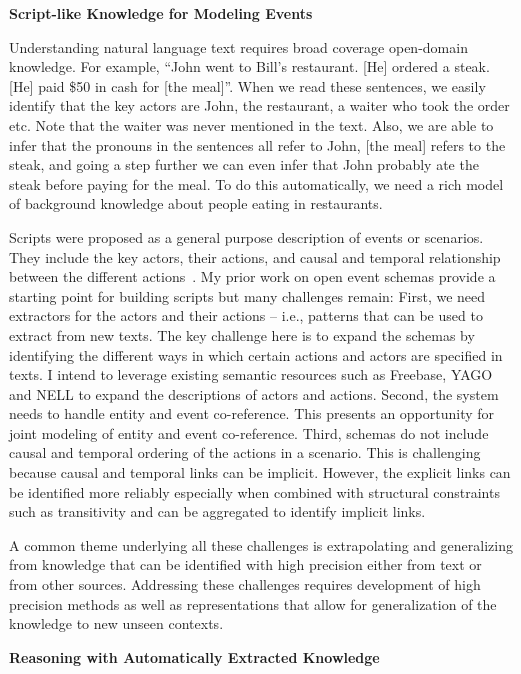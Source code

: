 \documentclass[a4paper,11pt,onecolumn]{article}
\begin{document}
{\bf Script-like Knowledge for Modeling Events}

Understanding natural language text requires broad coverage open-domain knowledge. For example, ``John went to Bill's restaurant. [He] ordered a steak. [He] paid \$50 in cash for [the meal]''. When we read these sentences, we easily identify that the key actors are John, the restaurant, a waiter who took the order etc. Note that the waiter was never mentioned in the text. Also, we are able to infer that the pronouns in the sentences all refer to John, [the meal] refers to the steak, and going a step further we can even infer that John probably ate the steak before paying for the meal. To do this automatically, we need a rich model of background knowledge about people eating in restaurants.

Scripts were proposed as a general purpose description of events or scenarios. They include the key actors, their actions, and causal and temporal relationship between the different actions~\cite{schank-scripts75}. My prior work on open event schemas provide a starting point for building scripts but many challenges remain: First, we need extractors for the actors and their actions -- i.e., patterns that can be used to extract from new texts. The key challenge here is to expand the schemas by identifying the different ways in which certain actions and actors are specified in texts. I intend to leverage existing semantic resources such as Freebase, YAGO and NELL to expand the descriptions of actors and actions. Second, the system needs to handle entity and event co-reference. This presents an opportunity for joint modeling of entity and event co-reference. Third, schemas do not include causal and temporal ordering of the actions in a scenario. This is challenging because causal and temporal links can be implicit. However, the explicit links can be identified more reliably especially when combined with structural constraints such as transitivity and can be aggregated to identify implicit links.

A common theme underlying all these challenges is extrapolating and generalizing from knowledge that can be identified with high precision either from text or from other sources.  Addressing these challenges requires development of high precision methods as well as representations that allow for generalization of the knowledge to new unseen contexts. 

{\bf Reasoning with Automatically Extracted Knowledge}
\end{document}
